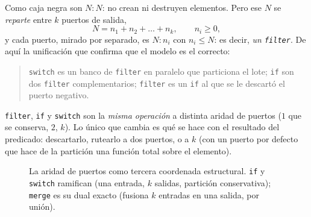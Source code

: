 \documentclass[11pt,a4paper]{article}
\theoremstyle{definition}
\theoremstyle{plain}
\begin{document}
Como caja negra son $N{:}N$: no crean ni destruyen elementos. Pero ese $N$ se
\emph{reparte} entre $k$ puertos de salida,
\[
  N = n_1 + n_2 + \dots + n_k, \qquad n_i \ge 0,
\]
y cada puerto, mirado por separado, es $N{:}n_i$ con $n_i \le N$: es decir, \emph{un
\texttt{filter}}. De aquí la unificación que confirma que el modelo es el correcto:
\begin{quote}
\texttt{switch} es un banco de \texttt{filter} en paralelo que particiona el lote;
\texttt{if} son dos \texttt{filter} complementarios; \texttt{filter} es un
\texttt{if} al que se le descartó el puerto negativo.
\end{quote}
\texttt{filter}, \texttt{if} y \texttt{switch} son la \emph{misma operación} a
distinta aridad de puertos ($1$ que se conserva, $2$, $k$). Lo único que cambia es
qué se hace con el resultado del predicado: descartarlo, rutearlo a dos puertos, o a
$k$ (con un puerto por defecto que hace de la partición una función total sobre el
elemento).

\begin{figure}[h]
\centering
{}
\caption{La aridad de puertos como tercera coordenada estructural. \texttt{if} y
\texttt{switch} ramifican (una entrada, $k$ salidas, partición conservativa);
\texttt{merge} es su dual exacto (fusiona $k$ entradas en una salida, por unión).}
\label{fig:ports}
\end{figure}
\end{document}
